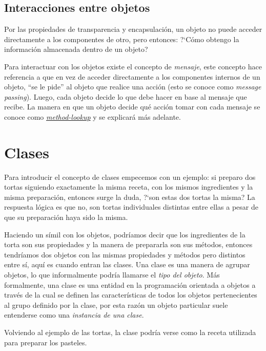     \subsection{Interacciones entre objetos}
      Por las propiedades de transparencia y encapsulación, un objeto no puede acceder 
      directamente a los componentes de otro, pero entonces: 
      ?`Cómo obtengo la información almacenada dentro de un objeto?
      
      Para interactuar con los objetos existe el concepto de \textit{mensaje}, este 
      concepto hace referencia a que en vez de acceder directamente a los componentes
      internos de un objeto, ``se le pide'' al objeto que realice una acción (esto se
      conoce como \textit{message passing}).
      Luego, cada objeto decide lo que debe hacer en base al mensaje que recibe.
      La manera en que un objeto decide qué acción tomar con cada mensaje se conoce 
      como \href{sec:method-lookup}{\textit{method-lookup}} y se explicará más 
      adelante.

  \section{Clases}
    Para introducir el concepto de clases empecemos con un ejemplo: si preparo dos 
    tortas siguiendo exactamente la misma receta, con los mismos ingredientes y la 
    misma preparación, entonces surge la duda, ?`son estas dos tortas la misma?
    La respuesta lógica es que no, son tortas individuales distintas entre ellas a 
    pesar de que su preparación haya sido la misma.
    
    Haciendo un símil con los objetos, podríamos decir que los ingredientes de la 
    torta son sus propiedades y la manera de prepararla son sus métodos, entonces 
    tendríamos dos objetos con las mismas propiedades y métodos pero distintos entre 
    sí, aquí es cuando entran las clases.
    Una clase es una manera de agrupar objetos, lo que informalmente podría llamarse 
    el \textit{tipo del objeto}.
    Más formalmente, una clase es una entidad en la programación orientada a objetos 
    a través de la cual se definen las características de todos los objetos 
    pertenecientes al grupo definido por la clase, por esta razón un objeto particular
    suele entenderse como una \textit{instancia de una clase}.

    Volviendo al ejemplo de las tortas, la clase podría verse como la receta utilizada
    para preparar los pasteles.

